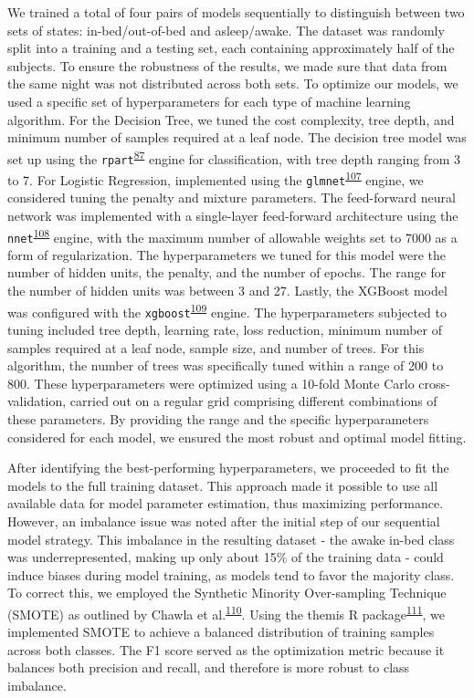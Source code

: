 \documentclass[
  9pt,
]{scrbook}
\begin{document}
We trained a total of four pairs of models sequentially to distinguish
between two sets of states: in-bed/out-of-bed and asleep/awake. The
dataset was randomly split into a training and a testing set, each
containing approximately half of the subjects. To ensure the robustness
of the results, we made sure that data from the same night was not
distributed across both sets. To optimize our models, we used a specific
set of hyperparameters for each type of machine learning algorithm. For
the Decision Tree, we tuned the cost complexity, tree depth, and minimum
number of samples required at a leaf node. The decision tree model was
set up using the
\texttt{rpart}\textsuperscript{\protect\hyperlink{ref-rpart}{87}} engine
for classification, with tree depth ranging from 3 to 7. For Logistic
Regression, implemented using the
\texttt{glmnet}\textsuperscript{\protect\hyperlink{ref-friedman_glmnet_2010}{107}}
engine, we considered tuning the penalty and mixture parameters. The
feed-forward neural network was implemented with a single-layer
feed-forward architecture using the
\texttt{nnet}\textsuperscript{\protect\hyperlink{ref-nnet}{108}} engine,
with the maximum number of allowable weights set to 7000 as a form of
regularization. The hyperparameters we tuned for this model were the
number of hidden units, the penalty, and the number of epochs. The range
for the number of hidden units was between 3 and 27. Lastly, the XGBoost
model was configured with the
\texttt{xgboost}\textsuperscript{\protect\hyperlink{ref-xgboost}{109}}
engine. The hyperparameters subjected to tuning included tree depth,
learning rate, loss reduction, minimum number of samples required at a
leaf node, sample size, and number of trees. For this algorithm, the
number of trees was specifically tuned within a range of 200 to 800.
These hyperparameters were optimized using a 10-fold Monte Carlo
cross-validation, carried out on a regular grid comprising different
combinations of these parameters. By providing the range and the
specific hyperparameters considered for each model, we ensured the most
robust and optimal model fitting.

After identifying the best-performing hyperparameters, we proceeded to
fit the models to the full training dataset. This approach made it
possible to use all available data for model parameter estimation, thus
maximizing performance. However, an imbalance issue was noted after the
initial step of our sequential model strategy. This imbalance in the
resulting dataset - the awake in-bed class was underrepresented, making
up only about 15\% of the training data - could induce biases during
model training, as models tend to favor the majority class. To correct
this, we employed the Synthetic Minority Over-sampling Technique (SMOTE)
as outlined by Chawla et
al.\textsuperscript{\protect\hyperlink{ref-chawla_smote_2002}{110}}.
Using the themis R
package\textsuperscript{\protect\hyperlink{ref-themis}{111}}, we
implemented SMOTE to achieve a balanced distribution of training samples
across both classes. The F1 score served as the optimization metric
because it balances both precision and recall, and therefore is more
robust to class imbalance.
\end{document}
